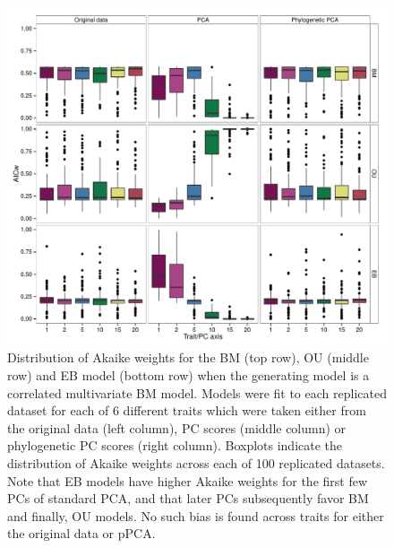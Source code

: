 \documentclass[a4paper,12pt]{article}
\begin{document}
\begin{figure}[p]
\centering
\includegraphics[scale=0.65]{./fig/box-aicw-corbm.pdf}
\caption{Distribution of Akaike weights for the BM (top row), OU (middle row) and EB model (bottom row) when the generating model is a correlated multivariate BM model. Models were fit to each replicated dataset for each of 6 different traits which were taken either from the original data (left column), PC scores (middle column) or phylogenetic PC scores (right column). Boxplots indicate the distribution of Akaike weights across each of 100 replicated datasets. Note that EB models have higher Akaike weights for the first few PCs of standard PCA, and that later PCs subsequently favor BM and finally, OU models. No such bias is found across traits for either the original data or pPCA.}
\label{corbm}
\end{figure}
\end{document}
